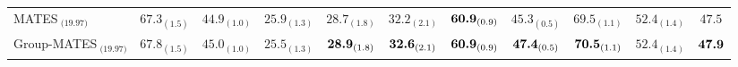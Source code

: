 \begin{table}
\begin{sc}
{\begin{tabular}{l|cccccccccc}
MATES$_\text{ (19.97)}$ & $\text{67.3}_{(\text{1.5})}$ & $\text{44.9}_{(\text{1.0})}$ & $\text{25.9}_{(\text{1.3})}$ & $\text{28.7}_{(\text{1.8})}$ & $\text{32.2}_{(\text{2.1})}$ & $\text{\textbf{60.9}}_{(\text{0.9})}$ & $\text{45.3}_{(\text{0.5})}$ & $\text{69.5}_{(\text{1.1})}$ & $\text{52.4}_{(\text{1.4})}$ & $\text{47.5}$ \\
\rowcolor{blue!10} Group-MATES$_\text{ (19.97)}$ & $\text{67.8}_{(\text{1.5})}$ & $\text{45.0}_{(\text{1.0})}$ & $\text{25.5}_{(\text{1.3})}$ & $\text{\textbf{28.9}}_{(\text{1.8})}$ & $\text{\textbf{32.6}}_{(\text{2.1})}$ & $\text{\textbf{60.9}}_{(\text{0.9})}$ & $\text{\textbf{47.4}}_{(\text{0.5})}$ & $\text{\textbf{70.5}}_{(\text{1.1})}$ & $\text{52.4}_{(\text{1.4})}$ & $\text{\textbf{47.9}}$ \\
    \bottomrule
  \end{tabular}
  }
  \end{sc}
\end{table}